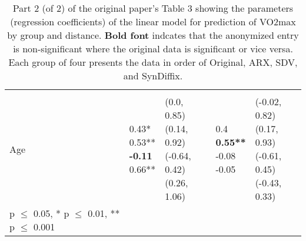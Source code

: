 \documentclass[10pt]{article}
\begin{document}
\begin{table}
\begin{center}
\begin{small}
\begin{tabular}{lllll}
& & & & \\ 
\quad Age    &  \makecell[l]{\textnormal{0.43*\phantom{**}} \\\textnormal{0.53**\phantom{*}} \\\textbf{-0.11\phantom{***}} \\\textnormal{0.66**\phantom{*}} \\}   &  \makecell[l]{\textnormal{(0.0, 0.85)} \\\textnormal{(0.14, 0.92)} \\\textnormal{(-0.64, 0.42)} \\\textnormal{(0.26, 1.06)} \\}   &  \makecell[l]{\textnormal{0.4\phantom{***}} \\\textbf{0.55**\phantom{*}} \\\textnormal{-0.08\phantom{***}} \\\textnormal{-0.05\phantom{***}} \\}   &  \makecell[l]{\textnormal{(-0.02, 0.82)} \\\textnormal{(0.17, 0.93)} \\\textnormal{(-0.61, 0.45)} \\\textnormal{(-0.43, 0.33)} \\} \\ 

      \bottomrule
      {\footnotesize * p $\leq$ 0.05, \quad** p $\leq$ 0.01, \quad*** p $\leq$ 0.001}
      \end{tabular}
      \end{small}
      \caption{Part 2 (of 2) of the original paper's Table 3 showing the parameters (regression coefficients) of the linear model for prediction of VO2max by group and distance. \textbf{Bold font} indcates that the anonymized entry is non-significant where the original data is significant or vice versa. Each group of four presents the data in order of Original, ARX, SDV, and SynDiffix. 
      }
      \label{tab:table3b}
      \end{center}
      \end{table}
      \setlength{\fboxsep}{3pt}
    


\end{document}
